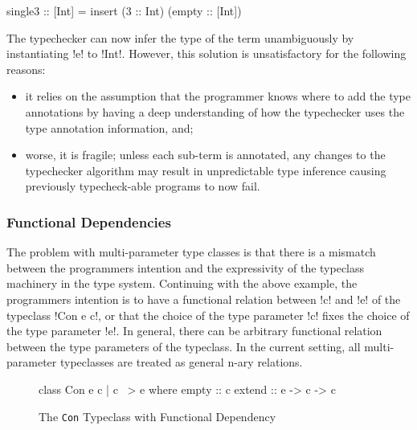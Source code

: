 \documentclass[screen,nonacm]{acmart}
\begin{document}
\begin{CenteredBox}
\begin{code}
single3 :: [Int] = insert (3 :: Int) (empty :: [Int])
\end{code}
\end{CenteredBox}

The typechecker can now infer the type of the term unambiguously by
instantiating !e! to !Int!. However, this solution is unsatisfactory
for the following reasons:
\begin{itemize}
\item it relies on the assumption that the programmer knows where to add the
  type annotations by having a deep understanding of how the typechecker
  uses the type annotation information, and;
\item worse, it is fragile;
  unless each sub-term is annotated, any changes to the typechecker
  algorithm may result in unpredictable type inference causing
  previously typecheck-able programs to now fail.
\end{itemize}

\subsubsection{Functional Dependencies}
The problem with multi-parameter type classes is that there is a
mismatch between the programmers intention and the expressivity of the
typeclass machinery in the type system. Continuing with the above example, the
programmers intention is to have a functional relation between !c! and
!e! of the typeclass !Con e c!, or that the choice of the type
parameter !c! fixes the choice of the type parameter !e!. In general,
there can be arbitrary functional relation between the type parameters
of the typeclass. In the current setting, all multi-parameter
typeclasses are treated as general n-ary relations.

\begin{figure}[ht]
\begin{CenteredBox}
\begin{code}
class Con e c | c ~> e where
  empty :: c
  extend :: e -> c -> c
\end{code}
\end{CenteredBox}
\caption[\lstinline{Con} typeclass]{The \lstinline{Con} Typeclass with Functional Dependency}
\label{fig:tc-collection-fd}
\end{figure}
\end{document}
